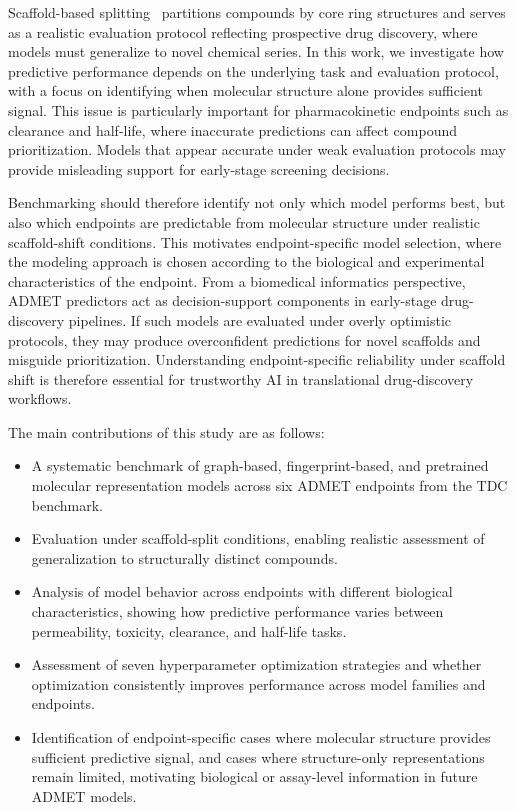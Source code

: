 \documentclass[journal]{IEEEtran}
\begin{document}
Scaffold-based splitting~\cite{doi:10.1021/jm9602928} partitions compounds by core ring structures and serves as a realistic evaluation protocol reflecting prospective drug discovery, where models must generalize to novel chemical series. In this work, we investigate how predictive performance depends on the underlying task and evaluation protocol, with a focus on identifying when molecular structure alone provides sufficient signal. This issue is particularly important for pharmacokinetic endpoints such as clearance and half-life, where inaccurate predictions can affect compound prioritization. Models that appear accurate under weak evaluation protocols may provide misleading support for early-stage screening decisions.

Benchmarking should therefore identify not only which model performs best, but also which endpoints are predictable from molecular structure under realistic scaffold-shift conditions. This motivates endpoint-specific model selection, where the modeling approach is chosen according to the biological and experimental characteristics of the endpoint. From a biomedical informatics perspective, ADMET predictors act as decision-support components in early-stage drug-discovery pipelines. If such models are evaluated under overly optimistic protocols, they may produce overconfident predictions for novel scaffolds and misguide prioritization. Understanding endpoint-specific reliability under scaffold shift is therefore essential for trustworthy AI in translational drug-discovery workflows.

The main contributions of this study are as follows:
\begin{itemize}
 \item A systematic benchmark of graph-based, fingerprint-based, and pretrained molecular representation models across six ADMET endpoints from the TDC benchmark.
 \item Evaluation under scaffold-split conditions, enabling realistic assessment of generalization to structurally distinct compounds.
 \item Analysis of model behavior across endpoints with different biological characteristics, showing how predictive performance varies between permeability, toxicity, clearance, and half-life tasks.
 \item Assessment of seven hyperparameter optimization strategies and whether optimization consistently improves performance across model families and endpoints.
 \item Identification of endpoint-specific cases where molecular structure provides sufficient predictive signal, and cases where structure-only representations remain limited, motivating biological or assay-level information in future ADMET models.
\end{itemize}
\end{document}
